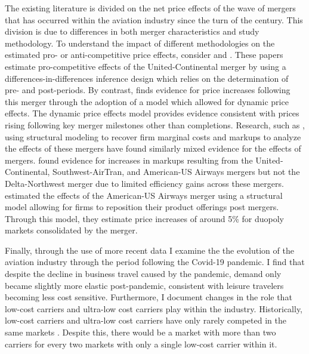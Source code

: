 \documentclass{article}
\begin{document}

    The existing literature is divided on the net price effects of the wave of mergers that has occurred within the aviation industry since the turn of the century. This division is due to differences in both merger characteristics and study methodology. To understand the impact of different methodologies on the estimated pro- or anti-competitive price effects, consider \citet{luo_price_2014} and \citet{carlton_are_2019}. These papers estimate pro-competitive effects of the United-Continental merger by using a differences-in-differences inference design which relies on the determination of pre- and post-periods. By contrast, \citet{fan_when_2020} finds evidence for price increases following this merger through the adoption of a model which allowed for dynamic price effects. The dynamic price effects model provides  evidence consistent with prices rising following key merger milestones other than completions. Research, such as \citet{bet_retrospective_2021, ciliberto_market_2021}, using structural modeling to recover firm marginal costs and markups to analyze the effects of these mergers have found similarly mixed evidence for the effects of mergers. \citet{bet_retrospective_2021} found evidence for increases in markups resulting from the United-Continental, Southwest-AirTran, and American-US Airways mergers but not the Delta-Northwest merger due to limited efficiency gains across these mergers. \citet{ciliberto_market_2021} estimated the effects of the American-US Airways merger using a structural model allowing for firms to reposition their product offerings post mergers. Through this model, they estimate price increases of around 5\% for duopoly markets consolidated by the merger. %

    Finally, through the use of more recent data I examine the the evolution of the aviation industry through the period following the Covid-19 pandemic. I find that despite the decline in business travel caused by the pandemic, demand only became slightly more elastic post-pandemic, consistent with leisure travelers becoming less cost sensitive. Furthermore, I document changes in the role that low-cost carriers and ultra-low cost carriers play within the industry. Historically, low-cost carriers and ultra-low cost carriers have only rarely competed in the same markets \citep{ciliberto_market_2021}. Despite this, there would be a market with more than two carriers for every two markets with only a single low-cost carrier within it.  
\end{document}
